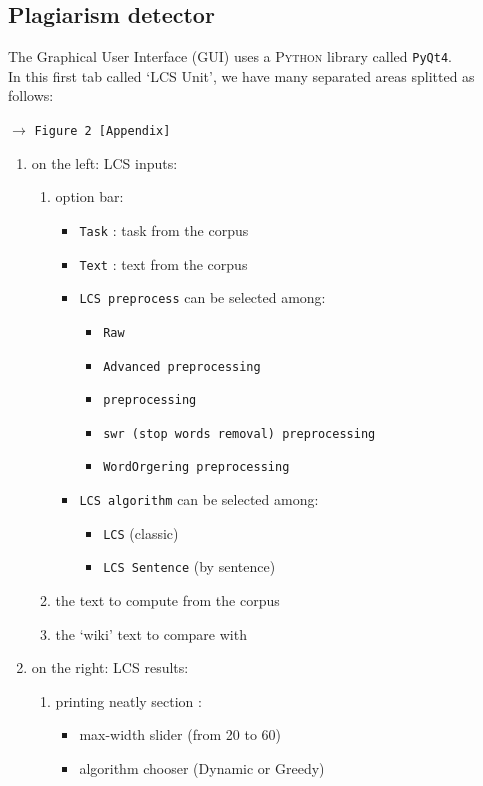 \documentclass[a4paper,12pt]{article}
\newcommand{\see}[1]{\begin{flushright}$\rightarrow$ \texttt{#1 [Appendix]}\end{flushright}}
\newcommand{\tw}[1]{\texttt{#1}}
\newcommand{\seeFigure}[1]{\see{Figure #1}}
\begin{document}
		\subsection{Plagiarism detector}
			The Graphical User Interface (GUI) uses a \textsc{Python} library called \texttt{PyQt4}. \\
			In this first tab called `LCS Unit', we have many separated areas splitted as follows:
			\seeFigure{2}
			\begin{enumerate}
				\item on the left: LCS inputs:
				\begin{enumerate}
					\item option bar:
					\begin{itemize}
						\item \tw{Task} : task from the corpus
						\item \tw{Text} : text from the corpus
						\item \tw{LCS preprocess} can be selected among:
						\begin{itemize}
							\item \tw{Raw}
							\item \tw{Advanced preprocessing}
							\item \tw{preprocessing}
							\item \tw{swr (stop words removal) preprocessing}
							\item \tw{WordOrgering preprocessing}
						\end{itemize}
						\item \tw{LCS algorithm} can be selected among:
						\begin{itemize}
							\item \tw{LCS} (classic)
							\item \tw{LCS Sentence} (by sentence)
						\end{itemize}
					\end{itemize}
					\item the text to compute from the corpus
					\item the `wiki' text to compare with
				\end{enumerate}
				\item on the right: LCS results:
				\begin{enumerate}
					\item printing neatly section :
					\begin{itemize}
						\item max-width slider (from 20 to 60)
						\item algorithm chooser (Dynamic or Greedy)

\end{itemize}
\end{enumerate}
\end{enumerate}
\end{document}
